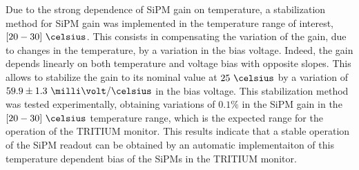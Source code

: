 \begin{enumerate}
\begin{enumerate}

Due to the strong dependence of SiPM gain on temperature, a stabilization method for SiPM gain was implemented in the temperature range of interest, $[20-30]~\celsius$. This consists in compensating the variation of the gain, due to changes in the temperature, by a variation in the bias voltage. Indeed, the gain depends linearly on both temperature and voltage bias with opposite slopes. This allows to stabilize the gain to its nominal value at $25~\celsius$ by a variation of $59.9 \pm 1.3 ~\milli\volt/\celsius$ in the bias voltage. This stabilization method was tested experimentally, obtaining variations of $0.1\%$ in the SiPM gain in the $[20-30]~\celsius$ temperature range, which is the expected range for the operation of the TRITIUM monitor. This results indicate that a stable operation of the SiPM readout can be obtained by an automatic implementaiton of this temperature dependent bias of the SiPMs in the TRITIUM monitor.


\end{enumerate}
\end{enumerate}
